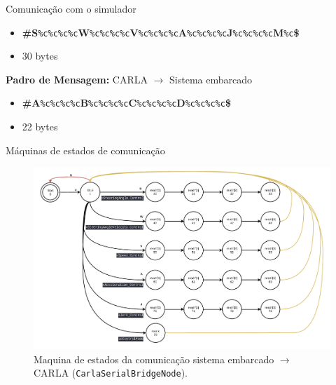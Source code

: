 \documentclass{if-beamer}
\begin{document}
\begin{frame}{Comunicação com o simulador}
\begin{block}{}
		\begin{itemize}
			\item \textbf{\#S}\texttt{\%c\%c\%c\%c}\textbf{W}\texttt{\%c\%c\%c\%c}\textbf{V}\texttt{\%c\%c\%c\%c}\textbf{A}\texttt{\%c\%c\%c\%c}\textbf{J}\texttt{\%c\%c\%c\%c}\textbf{M}\texttt{\%c}\textbf{\$}
			\item 30 bytes
			
		\end{itemize}
		
		\textbf{Padro de Mensagem:} CARLA $\longrightarrow$ Sistema embarcado
		\begin{itemize}
			\item \textbf{\#A}\texttt{\%c\%c\%c\%c}\textbf{B}\texttt{\%c\%c\%c\%c}\textbf{C}\texttt{\%c\%c\%c\%c}\textbf{D}\texttt{\%c\%c\%c\%c}\textbf{\$}
			\item 22 bytes
			
		\end{itemize}
		
	\end{block}
	
\end{frame}

\begin{frame}{Máquinas de estados de comunicação}
	
	\begin{figure}[H]
		\centering
		\includegraphics[width=0.8\linewidth]{sm_uc_2_carla}
		\caption{Maquina de estados da comunicação sistema embarcado $\longrightarrow$ CARLA (\texttt{CarlaSerialBridgeNode}).}
		\label{fig:sm_uc_2_carla}
	\end{figure}
	
\end{frame}
\end{document}
